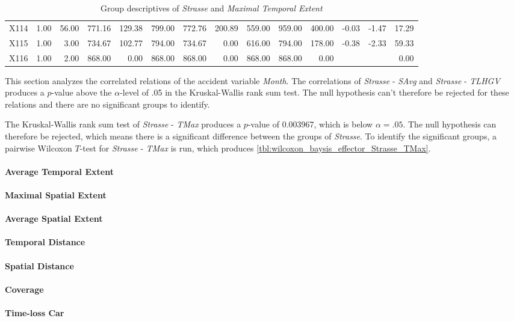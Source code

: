 \begin{table}[ht!]
\begin{tabular}{rrrrrrrrrrrrrr}
    X114 & 1.00 & 56.00 & 771.16 & 129.38 & 799.00 & 772.76 & 200.89 & 559.00 & 959.00 & 400.00 & -0.03 & -1.47 & 17.29 \\ 
    X115 & 1.00 & 3.00 & 734.67 & 102.77 & 794.00 & 734.67 & 0.00 & 616.00 & 794.00 & 178.00 & -0.38 & -2.33 & 59.33 \\ 
    X116 & 1.00 & 2.00 & 868.00 & 0.00 & 868.00 & 868.00 & 0.00 & 868.00 & 868.00 & 0.00 &  &  & 0.00 \\ 
     \hline
  \end{tabular}
	\caption{Group descriptives of \textit{Strasse} and \textit{Maximal Temporal Extent}}
	\label{tbl:descriptives_baysis_matched_Strasse_TMax}
\end{table}

This section analyzes the correlated relations of the accident variable \textit{Month}. The correlations of \textit{Strasse} - \textit{SAvg} and \textit{Strasse} - \textit{TLHGV} produces a $p$-value above the $\alpha$-level of .05 in the Kruskal-Wallis rank sum test. The null hypothesis can't therefore be rejected for these relations and there are no significant groups to identify.

The Kruskal-Wallis rank sum test of \textit{Strasse} - \textit{TMax} produces a $p$-value of 0.003967, which is below $\alpha=.05$. The null hypothesis can therefore be rejected, which means there is a significant difference between the groups of \textit{Strasse}. To identify the significant groups, a pairwise Wilcoxon $T$-test for \textit{Strasse} - \textit{TMax} is run, which produces \cref{tbl:wilcoxon_baysis_effector_Strasse_TMax}. 


\paragraph{Average Temporal Extent}

\paragraph{Maximal Spatial Extent}

\paragraph{Average Spatial Extent}

\paragraph{Temporal Distance}

\paragraph{Spatial Distance}

\paragraph{Coverage}

\paragraph{Time-loss Car}
